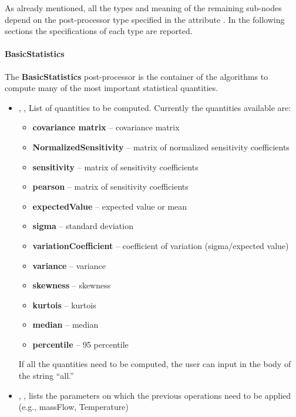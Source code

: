 As already mentioned, all the types and meaning of the remaining sub-nodes
depend on the post-processor type specified in the attribute .
%
In the following sections the specifications of each type are reported.

\paragraph{BasicStatistics}
\label{BasicStatistics}
The \textbf{BasicStatistics} post-processor is the container of the algorithms
to compute many of the most important statistical quantities.
%
\begin{itemize}
  \item {}, ,
  List of quantities to be computed.
  Currently the quantities available are:
  \begin{itemize}
    \item \textbf{covariance matrix} -- covariance matrix
    \item \textbf{NormalizedSensitivity} -- matrix of normalized sensitivity
    coefficients
    \item \textbf{sensitivity} -- matrix of sensitivity coefficients
    \item \textbf{pearson} -- matrix of sensitivity coefficients
    \item \textbf{expectedValue} -- expected value or mean
    \item \textbf{sigma} -- standard deviation
    \item \textbf{variationCoefficient} -- coefficient of variation
    (sigma/expected value)
    \item \textbf{variance} --  variance
    \item \textbf{skewness} -- skewness
    \item \textbf{kurtois} -- kurtois
    \item \textbf{median} -- median
    \item \textbf{percentile} -- 95 percentile
  \end{itemize}
  If all the quantities need to be computed, the user can input in the body of
   the string ``all.''
  \item {}, ,
  lists the parameters on which the previous operations need to be applied
  (e.g., massFlow, Temperature)

\end{itemize}
